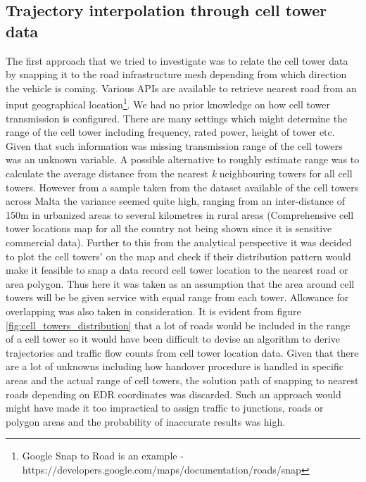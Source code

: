\documentclass[12pt, a4paper]{report}
\theoremstyle{definition}
\theoremstyle{definition}%
\theoremstyle{definition}%
\theoremstyle{definition}%
\theoremstyle{definition}%
\theoremstyle{definition}%
\begin{document}
\subsection{Trajectory interpolation through cell tower data} \label{subsection:methodology:trajectory_interpolation}
The first approach that we tried to investigate was to relate the cell tower data by snapping it to the road infrastructure mesh depending from which direction the vehicle is coming. Various APIs are available to retrieve nearest road from an input geographical location\footnote{Google Snap to Road is an example - https://developers.google.com/maps/documentation/roads/snap}. We had no prior knowledge on how cell tower transmission is configured. There are many settings which might determine the range of the cell tower including frequency, rated power, height of tower etc. Given that such information was missing transmission range of the cell towers was an unknown variable. A possible  alternative to roughly estimate range was to calculate the average distance from the nearest \textit{k} neighbouring towers for all cell towers. However from a sample taken from the dataset available of the cell towers across Malta the variance seemed quite high, ranging from an inter-distance of 150m in urbanized areas to several kilometres in rural areas (Comprehensive cell tower locations map for all the country not being shown since it is sensitive commercial data). Further to this from the analytical perspective it was decided to plot the cell towers' on the map and check if their distribution pattern would make it feasible to snap a data record cell tower location to the nearest road or area polygon. Thus here it was taken as an assumption that the area around cell towers will be be given service with equal range from each tower. Allowance for overlapping was also taken in consideration. It is evident from figure \ref{fig:cell_towers_distribution} that a lot of roads would be included in the range of a cell tower so it would have been difficult to devise an algorithm to derive trajectories and traffic flow counts from cell tower location data. Given that there are a lot of unknowns including how handover procedure is handled in specific areas and the actual range of cell towers, the solution path of snapping to nearest roads depending on EDR coordinates was discarded. Such an approach would might have made it too impractical to assign traffic to junctions, roads or polygon areas and the probability of inaccurate results was high.
\end{document}
